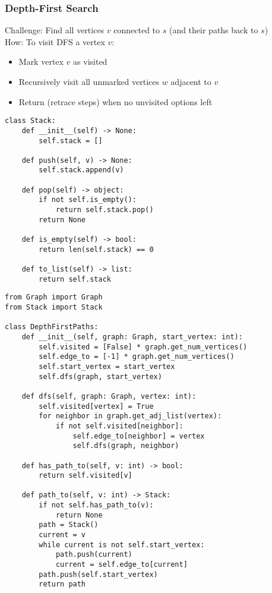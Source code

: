 \documentclass[a4paper]{article}
\begin{document}
\subsubsection*{Depth-First Search}
Challenge: Find all vertices $v$ connected to $s$ (and their paths back to $s$)\\
How: To visit DFS a vertex $v$:
\begin{itemize}
    \item Mark vertex $v$ as visited
    \item Recursively visit all unmarked vertices $w$ adjacent to $v$
    \item Return (retrace steps) when no unvisited options left
\end{itemize}

\begin{lstlisting}
class Stack:
    def __init__(self) -> None:
        self.stack = []

    def push(self, v) -> None:
        self.stack.append(v)

    def pop(self) -> object:
        if not self.is_empty():
            return self.stack.pop()
        return None

    def is_empty(self) -> bool:
        return len(self.stack) == 0

    def to_list(self) -> list:
        return self.stack
\end{lstlisting}

\begin{lstlisting}
from Graph import Graph
from Stack import Stack

class DepthFirstPaths:
    def __init__(self, graph: Graph, start_vertex: int):
        self.visited = [False] * graph.get_num_vertices()
        self.edge_to = [-1] * graph.get_num_vertices()
        self.start_vertex = start_vertex
        self.dfs(graph, start_vertex)

    def dfs(self, graph: Graph, vertex: int):
        self.visited[vertex] = True
        for neighbor in graph.get_adj_list(vertex):
            if not self.visited[neighbor]:
                self.edge_to[neighbor] = vertex
                self.dfs(graph, neighbor)

    def has_path_to(self, v: int) -> bool:
        return self.visited[v]

    def path_to(self, v: int) -> Stack:
        if not self.has_path_to(v):
            return None
        path = Stack()
        current = v
        while current is not self.start_vertex:
            path.push(current)
            current = self.edge_to[current]
        path.push(self.start_vertex)
        return path
\end{lstlisting}
\end{document}
